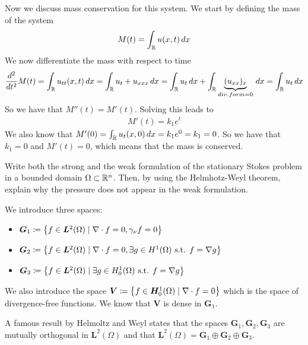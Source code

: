 Now we discuss mass conservation for this system. We start by defining the mass
of the system
\[
    \begin{split}
        M(t) = \int_{\mathbb{R}} u(x, t) \, dx
    \end{split}
\]
We now differentiate the mass with respect to time
\[
    \begin{split}
        \frac{d^2}{dt^2} M(t) = \int_{\mathbb{R}} u_{tt}(x, t) \, dx = \int_{\mathbb{R}} u_t + u_{xxx} \, dx = \int_{\mathbb{R}} u_t \, dx + \int_{\mathbb{R}} \underbrace{(u_{xx})_x}_{div. form = 0} \, dx = \int_{\mathbb{R}} u_t \, dx
    \end{split}
\]
So we have that \(M''(t) = M'(t)\). Solving this leads to
\[
    \begin{split}
        M'(t) = k_1 e^t
    \end{split}
\]
We also know that \(M'(0) = \int_{\mathbb{R}} u_t(x, 0) \, dx = k_1 e^0 = k_1 = 0\).
So we have that \(k_1 = 0\) and \(M'(t) = 0\), which means that the mass is
conserved.

\newpage
\begin{exercise}
    Write both the strong and the weak formulation of the stationary Stokes problem in a bounded domain \(\Omega \subset \mathbb{R}^n\). Then, by using the Helmhotz-Weyl theorem, explain why the pressure does not appear in the weak formulation.
\end{exercise}
\begin{remark}
    We introduce three spaces:
    \begin{itemize}
        \item \(\bm{G}_1 \coloneqq \left\{ f \in \bm{L}^2(\Omega) \mid \nabla \cdot f = 0, \gamma_\nu f = 0 \right\}\)
        \item \(\bm{G}_2 \coloneqq \left\{ f \in \bm{L}^2(\Omega) \mid \nabla \cdot f = 0, \exists g \in H^1(\Omega) \text{ s.t. } f = \nabla g \right\}\)
        \item \(\bm{G}_3 \coloneqq \left\{ f \in \bm{L}^2(\Omega) \mid \exists g \in H^1_0(\Omega) \text{ s.t. } f = \nabla g \right\}\)
    \end{itemize}
    We also introduce the space \(\bm{V} \coloneqq \left\{ f \in \bm{H}^1_0(\Omega) \mid \nabla \cdot f = 0 \right\}\) which is the space of divergence-free functions.
    We know that \(\bm{V}\) is dense in \(\bm{G}_1\).

    A famous result by Helmoltz and Weyl states that the spaces \(\bm{G}_1,
    \bm{G}_2, \bm{G}_3\) are mutually orthogonal in \(\bm{L}^2(\Omega)\) and that
    \(\bm{L}^2(\Omega) = \bm{G}_1 \oplus \bm{G}_2 \oplus \bm{G}_3\).
\end{remark}

